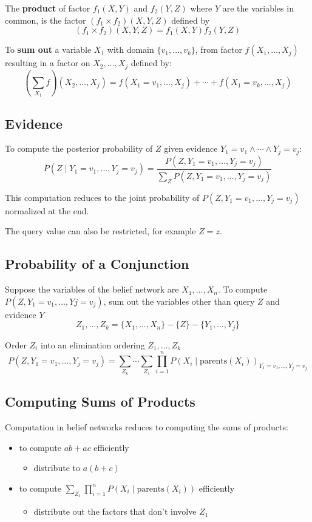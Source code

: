 \documentclass[11pt]{article}
\begin{document}
The \textbf{product} of factor \(f_{1} (X,Y)\) and \(f_{2} (Y,Z)\) where \(Y\) are the variables in common,
is the factor \((f_{1} \times f_{2}) (X,Y,Z)\) defined by
$$ (f_{1} \times f_{2}) (X,Y,Z) = f_{1} (X,Y) f_{2} (Y,Z) $$

To \textbf{sum out} a variable \(X_{1}\) with domain \(\{ v_{1}, \dots, v_{k} \}\), from factor
\(f(X_{1}, \dots, X_{j})\) resulting in a factor on \(X_{2}, \dots, X_{j}\) defined by:
$$ \left( \sum_{X_{1}} f \right) (X_{2}, \dots, X_{j}) = f(X_{1} = v_{1}, \dots, X_{j}) + \cdots + f(X_{1} = v_{k}, \dots, X_{j}) $$
\subsection{Evidence}
\label{sec:org2bbe6d9}
To compute the posterior probability of \(Z\) given evidence
\(Y_{1} = v_{1} \wedge \cdots \wedge Y_{j} = v_{j}\):
$$ P(Z \mid Y_{1} = v_{1}, \dots, Y_{j} = v_{j}) = \frac{P(Z, Y_{1} = v_{1}, \dots, Y_{j} = v_{j})}{\sum_{Z} P(Z, Y_{1} = v_{1}, \dots, Y_{j} = v_{j})} $$

This computation reduces to the joint probability of \(P(Z, Y_{1} = v_{1}, \dots, Y_{j} = v_{j})\)
normalized at the end.

The query value can also be restricted, for example \(Z = z\).
\subsection{Probability of a Conjunction}
\label{sec:org77753e9}
Suppose the variables of the belief network are \(X_{1}, \dots, X_{n}\).
To compute \(P(Z, Y_{1} = v_{1}, \dots, Y{j} = v_{j})\), sum out the variables other than query \(Z\)
and evidence \(Y\)
$$ Z_{1}, \dots, Z_{k} = \{ X_{1}, \dots, X_{n} \} - \{ Z \} - \{ Y_{1}, \dots, Y_{j} \} $$

Order \(Z_{i}\) into an elimination ordering \(Z_{1}, \dots, Z_{k}\)
$$ P(Z, Y_{1} = v_{1}, \dots, Y_{j} = v_{j}) = \sum_{Z_{k}} \cdots \sum_{Z_{1}} \prod_{i=1}^{n} P(X_{i} \mid \text{parents}(X_{i}))_{Y_{1} = v_{1}, \dots, Y_{j} = v_{j}} $$
\subsection{Computing Sums of Products}
\label{sec:orgf98b60e}
Computation in belief networks reduces to computing the sums of products:
\begin{itemize}
\item to compute \(ab + ac\) efficiently
\begin{itemize}
\item distribute to \(a(b + c)\)
\end{itemize}
\item to compute \(\sum_{Z_{1}} \prod_{i=1}^{n} P(X_{i} \mid \text{parents}(X_{i}))\) efficiently
\begin{itemize}
\item distribute out the factors that don't involve \(Z_{1}\)
\end{itemize}
\end{itemize}
\end{document}
